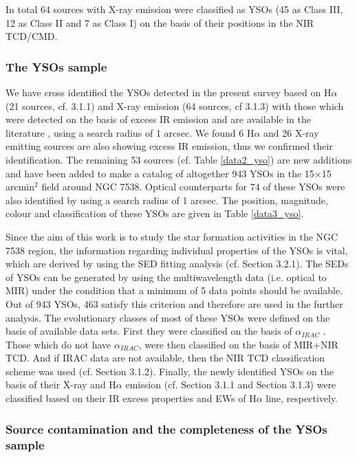 \documentclass[a4paper,fleqn,usenatbib,useAMS]{mnras}
\begin{document}
In total 64 sources with X-ray emission were classified as YSOs (45 as Class III, 12 as Class II and  
7 as Class I) on the basis of their positions in the NIR TCD/CMD. 

\subsubsection{The YSOs sample}

We have cross identified the YSOs detected in the present survey based on H$\alpha$ (21 sources, cf. 3.1.1) 
and X-ray emission (64 sources, cf 3.1.3) with those which were detected on the basis of excess IR emission 
and are  available in the literature 
\citep[890 sources, cf. Section 3.1.2 and Table \ref{data1_yso},][]{2004ApJ...616.1042O,2014MNRAS.443.3218M,2014MNRAS.439.3719C},
using a search radius of 1 arcsec. 
 We found 6 H$\alpha$ and 26 X-ray emitting sources are also showing excess IR emission, 
thus we confirmed their identification.
The remaining 53 sources (cf. Table \ref{data2_yso}) are new additions and have been added to make a catalog of altogether 943 YSOs 
in the 15$\times$15 arcmin$^2$ field around NGC 7538.
Optical counterparts for 74 of these YSOs were also identified by using a search radius of 1 arcsec.
The position, magnitude, colour and classification of these YSOs are given in Table \ref{data3_yso}.

Since the aim of this work is to study the star formation activities in the NGC 7538 region, 
the information regarding individual properties of the YSOs is vital, 
which are derived by using the SED fitting analysis (cf. Section 3.2.1).
The SEDs of YSOs can be generated by using the multiwavelength data (i.e. optical to MIR) under the 
condition that a minimum of 5 data points should be available.
Out of 943 YSOs, 463 satisfy this criterion and therefore are used in the further analysis.
The evolutionary classes of most of these YSOs were defined on the basis  of available data sets.
First they were classified on the basis of $\alpha_{IRAC}$ \citep[cf.][]{2014MNRAS.439.3719C}. 
Those which do not have $\alpha_{IRAC}$, were then classified on the basis of MIR+NIR TCD.
And if IRAC  data are not available, then the NIR TCD classification scheme was used (cf. Section 3.1.2).
Finally, the newly identified YSOs on the basis of their X-ray 
and H$\alpha$ emission (cf. Section 3.1.1 and Section 3.1.3) 
were classified based on their IR excess properties and EWs of H$\alpha$ line, respectively.

\subsubsection{Source contamination and  the completeness of the YSOs sample}
\end{document}
